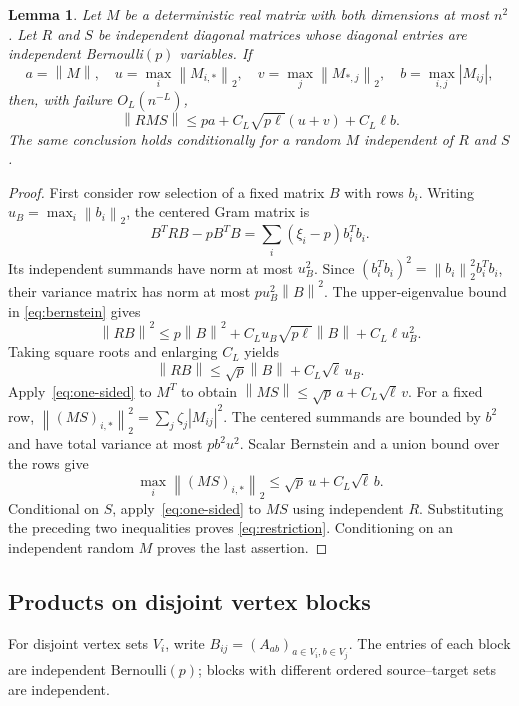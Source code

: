 \documentclass[11pt]{article}
\newtheorem{lemma}[theorem]{Lemma}
\theoremstyle{remark}
\newcommand{\norm}[1]{\left\lVert#1\right\rVert}
\begin{document}
\begin{lemma}\label{lem:restriction}
Let $M$ be a deterministic real matrix with both dimensions at most $n^2$.
Let $R$ and $S$ be independent diagonal matrices whose diagonal entries
are independent Bernoulli$(p)$ variables. If
\[
 a=\norm M,\quad u=\max_i\norm{M_{i,*}}_2,\quad
 v=\max_j\norm{M_{*,j}}_2,\quad b=\max_{i,j}|M_{ij}|,
\]
then, with failure $O_L(n^{-L})$,
\begin{equation}\label{eq:restriction}
 \norm{RMS}\leq pa+C_L\sqrt{p\ell}(u+v)+C_L\ell b.
\end{equation}
The same conclusion holds conditionally for a random $M$ independent of
$R$ and $S$.
\end{lemma}
\begin{proof}
First consider row selection of a fixed matrix $B$ with rows $b_i$.
Writing $u_B=\max_i\norm{b_i}_2$, the centered Gram matrix is
\[
 B^TRB-pB^TB=\sum_i(\xi_i-p)b_i^Tb_i.
\]
Its independent summands have norm at most $u_B^2$. Since
$(b_i^Tb_i)^2=\norm{b_i}_2^2 b_i^Tb_i$, their variance matrix has norm
at most $p u_B^2\norm B^2$. The upper-eigenvalue bound in
\eqref{eq:bernstein} gives
\[
 \norm{RB}^2\leq p\norm B^2
       +C_L u_B\sqrt{p\ell}\norm B+C_L\ell u_B^2.
\]
Taking square roots and enlarging $C_L$ yields
\begin{equation}\label{eq:one-sided}
 \norm{RB}\leq\sqrt p\norm B+C_L\sqrt\ell\,u_B.
\end{equation}
Apply~\eqref{eq:one-sided} to $M^T$ to obtain
$\norm{MS}\leq\sqrt p\,a+C_L\sqrt\ell\,v$.
For a fixed row, $\norm{(MS)_{i,*}}_2^2=\sum_j\zeta_j|M_{ij}|^2$.
The centered summands are bounded by $b^2$ and have total variance at most
$pb^2u^2$. Scalar Bernstein and a union bound over the rows give
\[
 \max_i\norm{(MS)_{i,*}}_2\leq\sqrt p\,u+C_L\sqrt\ell\,b.
\]
Conditional on $S$, apply~\eqref{eq:one-sided} to $MS$ using independent
$R$. Substituting the preceding two inequalities proves
\eqref{eq:restriction}. Conditioning on an independent random $M$
proves the last assertion.
\end{proof}

\subsection{Products on disjoint vertex blocks}

For disjoint vertex sets $V_i$, write $B_{ij}=(A_{ab})_{a\in V_i,b\in V_j}$.
The entries of each block are independent Bernoulli$(p)$; blocks with
different ordered source--target sets are independent.
\end{document}
